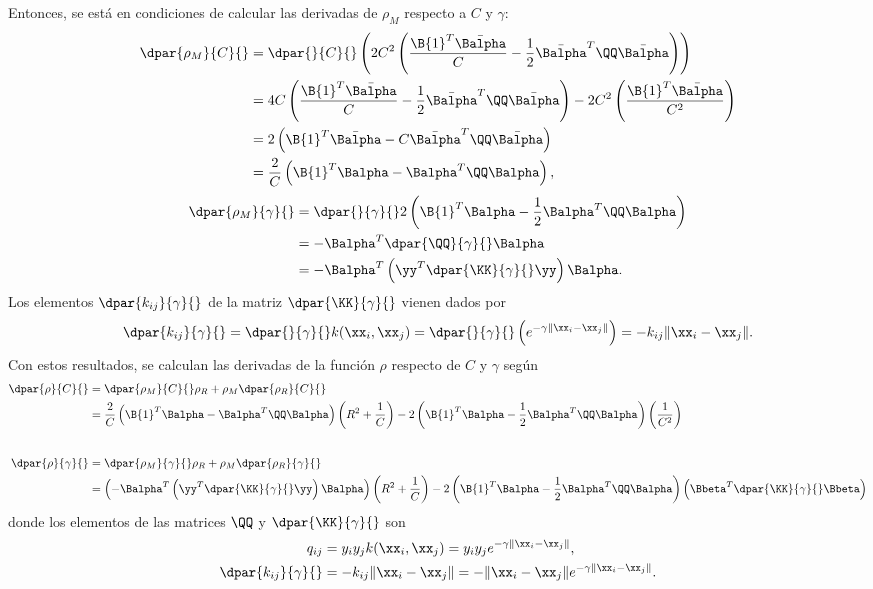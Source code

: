 %
Entonces, se está en condiciones de calcular las derivadas
de $\rho_M$ respecto a $C$ y $\gamma$:
%
\begin{align}
    \dpar{\rho_M}{C}{}
    &= \dpar{}{C}{}\left( 2C^2\left(\frac{\B{1}^T\bar{\Balpha}}{C} -
    \frac{1}{2}\bar{\Balpha}^T\QQ\bar{\Balpha}\right)
    \right) \\
    &= 4C \left(\frac{\B{1}^T\bar{\Balpha}}{C} -
    \frac{1}{2}\bar{\Balpha}^T\QQ\bar{\Balpha}\right)
    - 2C^2 \left(\frac{\B{1}^T\bar{\Balpha}}{C^2} \right) \\
    &= 2\left(\B{1}^T\bar{\Balpha}
    - C \bar{\Balpha}^T\QQ\bar{\Balpha}\right) \\
    &= \frac{2}{C} \left(\B{1}^T\Balpha - \Balpha^T\QQ\Balpha\right),
\end{align}
%
%
\begin{align}
    \dpar{\rho_M}{\gamma}{}
    &= \dpar{}{\gamma}{}
    2\left(  \B{1}^T\Balpha-\frac{1}{2}\Balpha^T\QQ\Balpha \right) \\
    &= - \Balpha^T \dpar{\QQ}{\gamma}{}\Balpha \\
    & = - \Balpha^T \left(\yy^T \dpar{\KK}{\gamma}{}\yy\right) \Balpha.
\end{align}
%
Los elementos $\dpar{k_{ij}}{\gamma}{}$ de la matriz $\dpar{\KK}{\gamma}{}$
vienen dados por
%
\begin{align}
  \dpar{k_{ij}}{\gamma}{}
  = \dpar{}{\gamma}{}k(\xx_i,\xx_j)
  = \dpar{}{\gamma}{} \left(e^{-\gamma\|\xx_i-\xx_j\|}\right)
  = -k_{ij}\|\xx_i-\xx_j\|.
\end{align}
%
Con estos resultados, se calculan las derivadas de la función $\rho$
respecto de $C$ y $\gamma$ según
%
\begin{align}
    \dpar{\rho}{C}{} &= \dpar{\rho_M}{C}{} \rho_R + \rho_M \dpar{\rho_R}{C}{} \\
    &= \frac{2}{C} \left(\B{1}^T\Balpha - \Balpha^T\QQ\Balpha\right) \left( R^2 + \frac{1}{C} \right)
    - 2\left(  \B{1}^T\Balpha-\frac{1}{2}\Balpha^T\QQ\Balpha \right)
    \left( \frac{1}{C^2} \right) \label{drho-dc} \\[2em]
    \dpar{\rho}{\gamma}{} &= \dpar{\rho_M}{\gamma}{} \rho_R + \rho_M \dpar{\rho_R}{\gamma}{}\\
    &= \left( - \Balpha^T \left(\yy^T \dpar{\KK}{\gamma}{}\yy\right) \Balpha \right)
    \left( R^2 + \frac{1}{C} \right)
    - 2\left(  \B{1}^T\Balpha-\frac{1}{2}\Balpha^T\QQ\Balpha \right)
    \left( \Bbeta^T \dpar{\KK}{\gamma}{} \Bbeta \right) \label{drho-dgamma}
\end{align}
%
donde los elementos de las matrices $\QQ$ y $\dpar{\KK}{\gamma}{}$ son
%
\begin{align}
  q_{ij}&=y_i y_j k(\xx_i,\xx_j)= y_i y_j e^{-\gamma\|\xx_i-\xx_j\|}, \\
  \dpar{k_{ij}}{\gamma}{}&=-k_{ij}\|\xx_i-\xx_j\| = -\|\xx_i-\xx_j\|e^{-\gamma\|\xx_i-\xx_j\|}.
\end{align}
%
